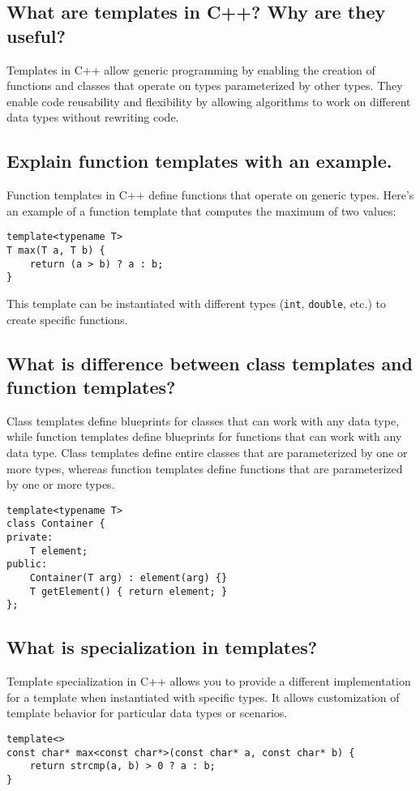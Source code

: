 \subsection{What are templates in C++? Why are they useful?}
Templates in C++ allow generic programming by enabling the creation of functions and classes that operate on types parameterized by other types. They enable code reusability and flexibility by allowing algorithms to work on different data types without rewriting code.

\subsection{Explain function templates with an example.}
Function templates in C++ define functions that operate on generic types. Here's an example of a function template that computes the maximum of two values:
\begin{tcolorbox}[title=Function Template]
\begin{verbatim}
template<typename T>
T max(T a, T b) {
    return (a > b) ? a : b;
}
\end{verbatim}
\end{tcolorbox}
This template can be instantiated with different types (\texttt{int}, \texttt{double}, etc.) to create specific functions.

\subsection{What is difference between class templates and function templates?}
Class templates define blueprints for classes that can work with any data type, while function templates define blueprints for functions that can work with any data type. Class templates define entire classes that are parameterized by one or more types, whereas function templates define functions that are parameterized by one or more types.
\begin{tcolorbox}[title=Class Template]
\begin{verbatim}
template<typename T>
class Container {
private:
    T element;
public:
    Container(T arg) : element(arg) {}
    T getElement() { return element; }
};
\end{verbatim}
\end{tcolorbox}

\subsection{What is specialization in templates?}
Template specialization in C++ allows you to provide a different implementation for a template when instantiated with specific types. It allows customization of template behavior for particular data types or scenarios.
\begin{tcolorbox}[title=Specialization in Template]
\begin{verbatim}
template<>
const char* max<const char*>(const char* a, const char* b) {
    return strcmp(a, b) > 0 ? a : b;
}
\end{verbatim}
\end{tcolorbox}

